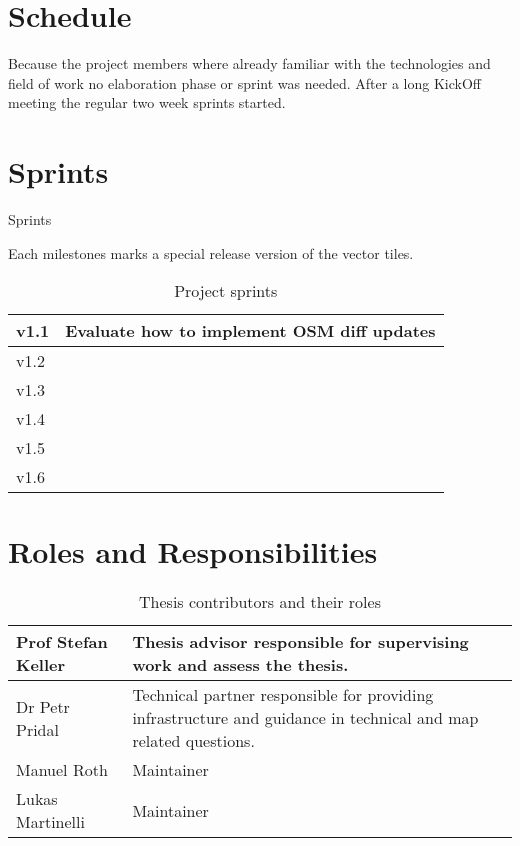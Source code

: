 \section{Schedule}

Because the project members where already familiar with the technologies and field of work
no elaboration phase or sprint was needed. After a long KickOff meeting the regular two week
sprints started.

\section{Sprints}

Sprints

Each milestones marks a special release version of the vector tiles.

\begin{table}[H]
\centering
    \begin{tabular}{p{2.5cm} p{10cm}}
    v1.1 &  Evaluate how to implement OSM diff updates\\ \hline
    v1.2 &  \\ \hline
    v1.3 &  \\ \hline
    v1.4 &  \\ \hline
    v1.5 &  \\ \hline
    v1.6 &  \\ \hline
    \end{tabular}
    \caption[Milestones]{Project sprints}
\end{table}

\section{Roles and Responsibilities}\label{roles-and-responsibilities}

\begin{table}[H]
\centering
    \begin{tabular}{p{3cm} p{9.5cm}}
Prof Stefan Keller & Thesis advisor responsible for supervising work and
assess the thesis.\\ \hline
Dr Petr Pridal &
Technical partner responsible for providing infrastructure and guidance in technical and map related questions.\\ \hline
Manuel Roth &
Maintainer\\ \hline
Lukas Martinelli &
Maintainer\\ \hline
    \end{tabular}
    \caption{Thesis contributors and their roles}
\end{table}

